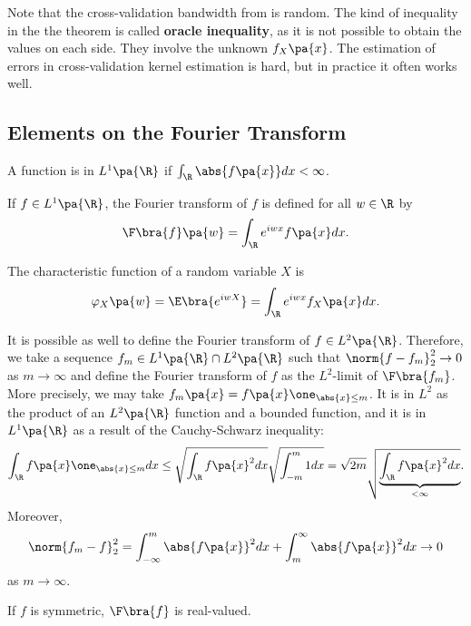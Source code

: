 \newpage
{}

Note that the cross-validation bandwidth from  is random. The kind of inequality in the the theorem is called \textbf{oracle inequality}, as it is not possible to obtain the values on each side. They involve the unknown $f_X\pa{x}$. The estimation of errors in cross-validation kernel estimation is hard, but in practice it often works well.

\subsection{Elements on the Fourier Transform}
A function is in $L^1\pa{\R}$ if $\int_{\R} \abs{f\pa{x}}dx <\infty$.
\begin{definition}
  If $f\in L^1\pa{\R}$, the Fourier transform of $f$ is defined for all $w\in \R$ by
  \begin{equation}
    \F\bra{f}\pa{w} = \int_\R e^{iwx} f\pa{x}dx.
  \end{equation}
\end{definition}
\begin{remark}
  The characteristic function of a random variable $X$ is
  \begin{equation}
    \varphi_X\pa{w} = \E\bra{e^{iwX}} = \int_\R e^{iwx} f_X\pa{x}dx.
  \end{equation}
\end{remark}
\begin{remark}\label{rem:fourier_l2}
  It is possible as well to define the Fourier transform of $f\in L^2\pa{\R}$. Therefore, we take a sequence $f_m \in L^1\pa{\R}\cap L^2\pa{\R}$ such that $\norm{f-f_m}^2_2\rightarrow 0$ as $m\rightarrow \infty$ and define the Fourier transform of $f$ as the $L^2$-limit of $\F \bra{f_m}$. More precisely, we may take $f_m\pa{x} = f\pa{x} \one_{\abs{x}\leq m}$. It is in $L^2$ as the product of an $L^2\pa{\R}$ function and a bounded function, and it is in $L^1\pa{\R}$ as a result of the Cauchy-Schwarz inequality:
  \begin{equation}
    \int_{\R} f\pa{x} \one_{\abs{x}\leq m} dx \leq \sqrt{\int_{\R} f\pa{x}^2 dx } \sqrt{\int_{-m}^m 1 dx } = \sqrt{2m}  \sqrt{\underbrace{\int_{\R} f\pa{x}^2 dx}_{<\infty} }.
  \end{equation}
  Moreover,
  \begin{equation}\label{eq:cauchy}
    \norm{f_m -f}^2_2 = \int_{-\infty}^m \abs{f\pa{x}}^2 dx + \int_m^\infty \abs{f\pa{x}}^2 dx \rightarrow 0
  \end{equation}
  as $m\rightarrow \infty$.
\end{remark}
\begin{exercise}
  If $f$ is symmetric, $\F \bra{f}$ is real-valued.
\end{exercise}

